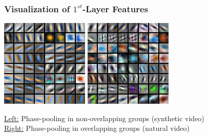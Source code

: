 \documentclass{beamer}
\begin{document}
\begin{frame} 
\frametitle{Visualization of $1^{st}$-Layer Features}
\begin{center} 
\includegraphics[scale=0.6]{./Figures/Project2/pretty_decoder.png} \hspace{1cm} 
\includegraphics[scale=0.6]{./Figures/Project2/dec200.png} 
\end{center} 
\underline{Left:} Phase-pooling in non-overlapping groups (synthetic video) \\
\underline{Right:} Phase-pooling in overlapping groups (natural video) 
\end{frame} 
\end{document}
